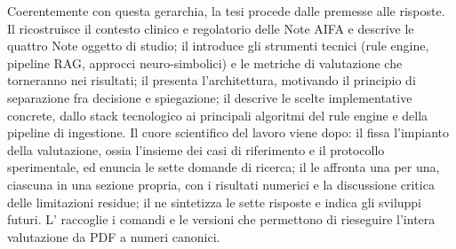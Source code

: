 Coerentemente con questa gerarchia, la tesi procede dalle premesse alle risposte. Il  ricostruisce il contesto clinico e regolatorio delle Note AIFA e descrive le quattro Note oggetto di studio; il  introduce gli strumenti tecnici (rule engine, pipeline RAG, approcci neuro-simbolici) e le metriche di valutazione che torneranno nei risultati; il  presenta l'architettura, motivando il principio di separazione fra decisione e spiegazione; il  descrive le scelte implementative concrete, dallo stack tecnologico ai principali algoritmi del rule engine e della pipeline di ingestione. Il cuore scientifico del lavoro viene dopo: il  fissa l'impianto della valutazione, ossia l'insieme dei casi di riferimento e il protocollo sperimentale, ed enuncia le sette domande di ricerca; il  le affronta una per una, ciascuna in una sezione propria, con i risultati numerici e la discussione critica delle limitazioni residue; il  ne sintetizza le sette risposte e indica gli sviluppi futuri. L' raccoglie i comandi e le versioni che permettono di rieseguire l'intera valutazione da PDF a numeri canonici.
